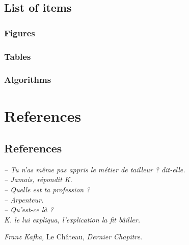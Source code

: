 \documentclass[12pt,fleqn]{book} %
\begin{document}
{\pagestyle{empty} %

\tableofcontents %
\begingroup
\makeatletter
\chapter*{List of items}
\section*{Figures}
\let\clearpage\relax
\section*{Tables}
\section*{Algorithms}
\makeatother
\endgroup


\cleardoublepage %

\pagestyle{fancy} %

%
%
\clearpage




\part{References}
\chapter*{References}
\vspace{-3cm}
\emph{– Tu n’as même pas appris le métier de tailleur ? dit-elle.\\
– Jamais, répondit K.\\
– Quelle est ta profession ?\\
– Arpenteur.\\
– Qu’est-ce là ? \\
K. le lui expliqua, l’explication la fit bâiller. } \\ \vspace{-1.2cm}
\begin{flushright}
\emph{Franz Kafka,} Le Château, \emph{Dernier Chapitre}.
\end{flushright}
\begin{refcontext}[sorting=nyt]
\printbibliography[heading=bibempty]
\end{refcontext}
\end{document}
